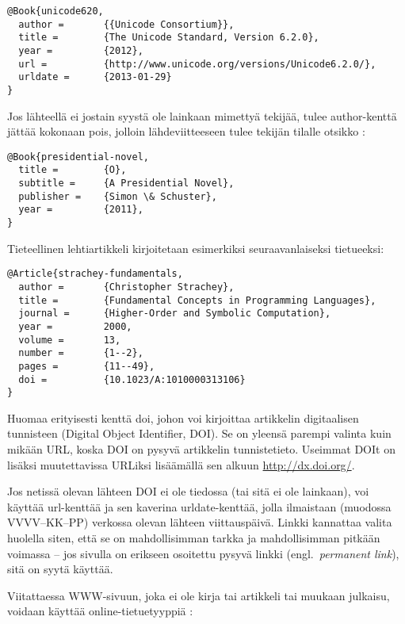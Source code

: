 \documentclass[utf8,bachelor]{gradu3}
\begin{document}
\begingroup\footnotesize
\begin{verbatim}
@Book{unicode620,
  author =       {{Unicode Consortium}},
  title =        {The Unicode Standard, Version 6.2.0},
  year =         {2012},
  url =          {http://www.unicode.org/versions/Unicode6.2.0/},
  urldate =      {2013-01-29}
}
\end{verbatim}
\endgroup

Jos lähteellä ei jostain syystä ole lainkaan mimettyä tekijää, tulee
author-kenttä jättää kokonaan pois, jolloin lähdeviitteeseen tulee
tekijän tilalle otsikko \parencite[esim.][]{presidential-novel}:

\begingroup\footnotesize
\begin{verbatim}
@Book{presidential-novel,
  title =        {O},
  subtitle =     {A Presidential Novel},
  publisher =    {Simon \& Schuster},
  year =         {2011},
}
\end{verbatim}
\endgroup

Tieteellinen lehtiartikkeli \parencite[esim.][]{strachey-fundamentals}
kirjoitetaan esimerkiksi seuraavanlaiseksi tietueeksi:

\begingroup\footnotesize
\begin{verbatim}
@Article{strachey-fundamentals,
  author =       {Christopher Strachey},
  title =        {Fundamental Concepts in Programming Languages},
  journal =      {Higher-Order and Symbolic Computation},
  year =         2000,
  volume =       13,
  number =       {1--2},
  pages =        {11--49},
  doi =          {10.1023/A:1010000313106}
}
\end{verbatim}
\endgroup

Huomaa erityisesti kenttä doi, johon voi kirjoittaa artikkelin
digitaalisen tunnisteen (Digital Object Identifier, DOI).  Se on
yleensä parempi valinta kuin mikään URL, koska DOI on pysyvä
artikkelin tunnistetieto.  Useimmat DOIt on lisäksi muutettavissa
URLiksi lisäämällä sen alkuun \url{http://dx.doi.org/}.

Jos netissä olevan lähteen DOI ei ole tiedossa (tai sitä ei ole
lainkaan), voi käyttää url-kenttää ja sen kaverina urldate-kenttää,
jolla ilmaistaan (muodossa VVVV--KK--PP) verkossa olevan lähteen
viittauspäivä.  Linkki kannattaa valita huolella siten, että se on
mahdollisimman tarkka ja mahdollisimman pitkään voimassa -- jos
sivulla on erikseen osoitettu pysyvä linkki (engl.~\emph{permanent
  link}), sitä on syytä käyttää.

Viitattaessa WWW-sivuun, joka ei ole kirja tai artikkeli tai muukaan
julkaisu, voidaan käyttää
online-tietuetyyppiä \parencite[esim.][]{debian-social-contract}:
\end{document}
